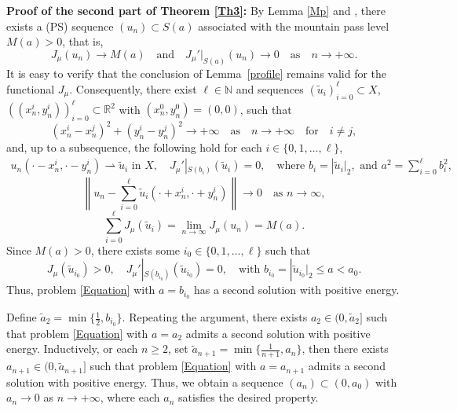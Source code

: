 \documentclass[11pt]{amsart}
\numberwithin{equation}{section}
\begin{document}
{{{\noindent \textbf{Proof of the second part of Theorem \ref{Th3}:}
        By Lemma \ref{Mp} and \cite[Theorem 2.5]{Chen2024Another}, there exists a (PS) sequence $(u_n) \subset S(a)$ associated with the mountain pass level $M(a)>0$, that is,
        \[
        J_\mu(u_n) \to M(a) \quad \text{and} \quad J_\mu'|_{S(a)}(u_n) \to 0 \quad \text{as} \quad n \to +\infty.
        \]
        It is easy to verify that the conclusion of Lemma~\ref{profile} remains valid for the functional $J_\mu$. Consequently, there exist $\ell \in \mathbb{N}$ and sequences $\left(\widetilde{u}_i\right)_{i=0}^{\ell} \subset X$, $\left((x_n^i,y_n^i)\right)_{i=0}^{\ell} \subset \mathbb{R}^2$ with $(x_n^0,y_n^0)=(0,0)$, such that
        \[
        (x_n^i - x_n^j)^2 + (y_n^i - y_n^j)^2 \to +\infty \quad \text{as} \quad n \to +\infty \quad \text{for} \quad i \neq j,
        \]
        and, up to a subsequence, {the following hold for each $i\in \{0,1,\ldots,\ell\}$},
        \begin{equation}\label{eq:com122}
            \begin{aligned}
                u_n(\cdot - x_n^i, \cdot - y_n^i) \rightharpoonup \widetilde{u}_i \text{ in } X, \quad
                J_\mu'|_{S(b_i)}(\widetilde{u}_i) = 0, \quad \text{where } b_i = |\widetilde{u}_i|_2, \text{ and } a^2 = \sum_{i=0}^{\ell} b_i^2,
            \end{aligned}
        \end{equation}
        \begin{equation}\label{eq:com11}
            \left\| u_n - \sum_{i=0}^{\ell} \widetilde{u}_i(\cdot + x_n^i, \cdot + y_n^i) \right\| \to 0 \quad \text{as } n \to \infty,
        \end{equation}
        \begin{equation}\label{eq:com13}
            \sum_{i=0}^{\ell} J_\mu(\widetilde{u}_i) = \lim_{n \to \infty} J_\mu(u_n) = M(a).
        \end{equation}
        Since $M(a) > 0$, there exists some $i_0 \in \{0,1,\ldots,\ell\}$ such that
        \[
        J_\mu(\widetilde{u}_{i_0}) > 0, \quad J_\mu'|_{S(b_{i_0})}(\widetilde{u}_{i_0}) = 0, \quad \text{with } b_{i_0} = |\widetilde{u}_{i_0}|_2 \leq a < a_0.
        \]
        Thus, problem \eqref{Equation} with $a = b_{i_0}$ has a second solution with positive energy.

{ Define $\tilde{a}_{2} = \min\{\frac{1}{2}, b_{i_0}\}$. Repeating the argument, there exists $a_2 \in (0, \tilde{a}_{2}]$ such that problem \eqref{Equation} with $a = a_2$ admits a second solution with positive energy. Inductively, or each $n \geq 2$, set $\tilde{a}_{n+1}=\min\{\frac{1}{n+1}, a_n\}$, then there exists $a_{n+1} \in (0, \tilde{a}_{n+1}]$ such that problem \eqref{Equation} with $a = a_{n+1}$ admits a second solution with positive energy. Thus, we obtain a sequence $(a_n) \subset (0, a_0)$ with $a_n \to 0$ as $n \to +\infty$, where each $a_n$ satisfies the desired property.}


}}}
\end{document}
